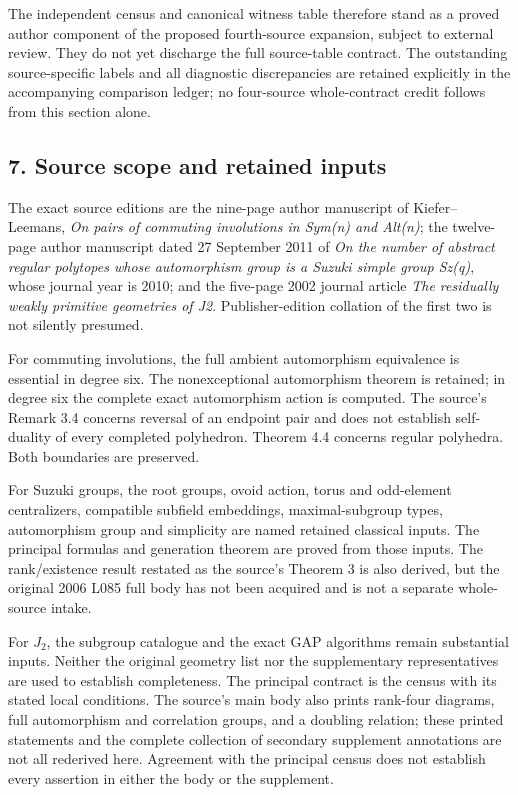 \documentclass[
  11pt,
  a4paper,
]{article}
\newcounter{none} %
\begin{document}
The independent census and canonical witness table therefore stand as a
proved author component of the proposed fourth-source expansion, subject
to external review. They do not yet discharge the full source-table
contract. The outstanding source-specific labels and all diagnostic
discrepancies are retained explicitly in the accompanying comparison
ledger; no four-source whole-contract credit follows from this section
alone.

\subsection{7. Source scope and retained
inputs}\label{source-scope-and-retained-inputs}

The exact source editions are the nine-page author manuscript of
Kiefer--Leemans, \emph{On pairs of commuting involutions in Sym(n) and
Alt(n)}; the twelve-page author manuscript dated 27 September 2011 of
\emph{On the number of abstract regular polytopes whose automorphism
group is a Suzuki simple group Sz(q)}, whose journal year is 2010; and
the five-page 2002 journal article \emph{The residually weakly primitive
geometries of J2}. Publisher-edition collation of the first two is not
silently presumed.

For commuting involutions, the full ambient automorphism equivalence is
essential in degree six. The nonexceptional automorphism theorem is
retained; in degree six the complete exact automorphism action is
computed. The source's Remark 3.4 concerns reversal of an endpoint pair
and does not establish self-duality of every completed polyhedron.
Theorem 4.4 concerns regular polyhedra. Both boundaries are preserved.

For Suzuki groups, the root groups, ovoid action, torus and odd-element
centralizers, compatible subfield embeddings, maximal-subgroup types,
automorphism group and simplicity are named retained classical inputs.
The principal formulas and generation theorem are proved from those
inputs. The rank/existence result restated as the source's Theorem 3 is
also derived, but the original 2006 L085 full body has not been acquired
and is not a separate whole-source intake.

For \(J_2\), the subgroup catalogue and the exact GAP algorithms remain
substantial inputs. Neither the original geometry list nor the
supplementary representatives are used to establish completeness. The
principal contract is the census with its stated local conditions. The
source's main body also prints rank-four diagrams, full automorphism and
correlation groups, and a doubling relation; these printed statements
and the complete collection of secondary supplement annotations are not
all rederived here. Agreement with the principal census does not
establish every assertion in either the body or the supplement.
\end{document}
